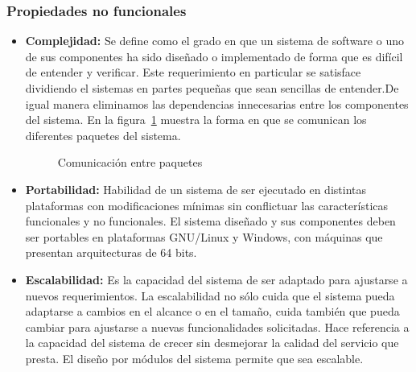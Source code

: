 	\subsubsection{Propiedades no funcionales}
		\begin{itemize}
			\item \textbf{Complejidad:} Se define como el grado en que un sistema de software o uno de sus componentes ha sido diseñado o implementado de forma que es difícil de entender y verificar. Este requerimiento en particular se satisface dividiendo el sistemas en partes pequeñas que sean sencillas de entender.De igual manera eliminamos las dependencias innecesarias entre los componentes del sistema.
			En la figura~\ref{fig:vistalogica} muestra la forma en que se comunican los diferentes paquetes del sistema.
				
				\begin{figure}[htbp!]
					\begin{center}
						\caption{Comunicación entre paquetes}
						\label{fig:vistalogica}
					\end{center}
				\end{figure}
			
			\item \textbf{Portabilidad:} Habilidad de un sistema de ser ejecutado en distintas plataformas con modificaciones mínimas sin conflictuar las características funcionales y no funcionales. El sistema diseñado y sus componentes deben ser portables en plataformas GNU/Linux y Windows, con máquinas que presentan arquitecturas de 64 bits. 
						
			\item \textbf{Escalabilidad:} Es la capacidad del sistema de ser adaptado para ajustarse a nuevos requerimientos. La escalabilidad no sólo cuida que el sistema pueda adaptarse a cambios en el alcance o en el tamaño, cuida también que pueda cambiar para ajustarse a nuevas funcionalidades solicitadas. Hace referencia a la capacidad del sistema de crecer sin desmejorar la calidad del servicio que presta. El diseño por módulos del sistema permite que sea escalable.
			

\end{itemize}
